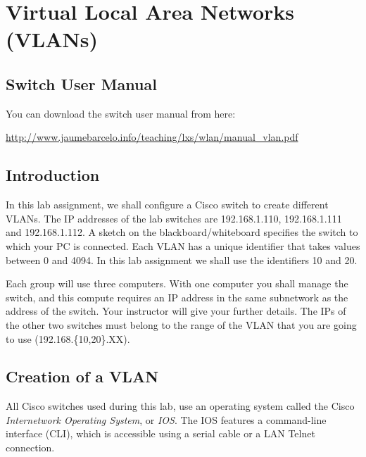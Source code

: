 \chapter{Virtual Local Area Networks (VLANs)}

\section{Switch User Manual}

You can download the switch user manual from here:

\url{http://www.jaumebarcelo.info/teaching/lxs/wlan/manual_vlan.pdf}

\section{Introduction}

In this lab assignment, we shall configure a Cisco switch to create different VLANs. The IP addresses of the lab switches are 192.168.1.110, 192.168.1.111 and 192.168.1.112. A sketch on the blackboard/whiteboard specifies the switch to which your PC is connected. Each VLAN has a unique identifier that takes values between 0 and 4094. In this lab assignment we shall use the identifiers 10 and 20.

Each group will use three computers. With one computer you shall manage the switch, and this compute requires an IP address in the same subnetwork as the address of the switch. Your instructor will give your further details. {\color{red}The IPs of the other two switches must belong to the range of the VLAN that you are going to use (192.168.\{10,20\}.XX).}


\section{Creation of a VLAN}

All Cisco switches used during this lab, use an operating system called the Cisco \emph{Internetwork Operating System}, or \emph{IOS}. The IOS features a command-line interface (CLI), which is accessible using a serial cable or a LAN Telnet connection.


